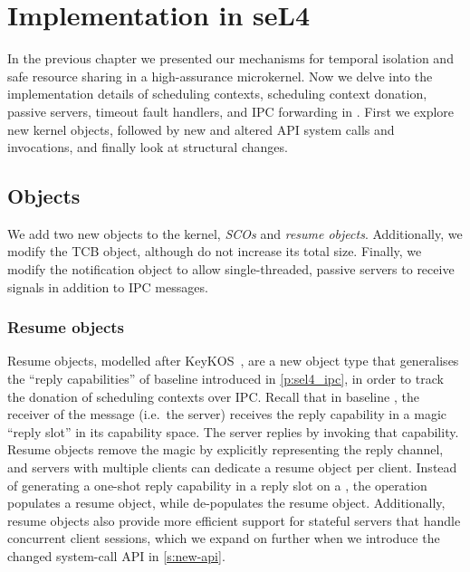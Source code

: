\chapter{Implementation in seL4}
\label{chap:implementation}

In the previous chapter we presented our mechanisms for temporal isolation and safe resource sharing
in a high-assurance microkernel. 
Now we delve into the implementation details of scheduling contexts, scheduling context donation,
passive servers, timeout fault handlers, and IPC forwarding in \selfour. First we explore new kernel
objects, followed by new and altered API system calls and invocations, and finally look at structural changes.

\section{Objects}

We add two new objects to the kernel, \emph{\glspl{SCO}} and \emph{resume objects}. Additionally, we modify
the \gls{TCB} object, although do not increase its total size. Finally, we modify the notification
object to allow single-threaded, passive servers to receive signals in
addition to IPC messages.

\subsection{Resume objects}
\label{s:resume}

Resume objects, modelled after KeyKOS~\citep{Bomberger_FFHLS_92}, are a new object type that
generalises the ``reply capabilities'' of baseline \selfour introduced in \cref{p:sel4_ipc}, in
order to track the donation of scheduling contexts over \gls{IPC}.  Recall that in
baseline \selfour, the receiver of the message (i.e.\ the server) receives the reply capability in a
magic ``reply slot'' in its capability space. The server replies by invoking that capability. Resume
objects remove the magic by explicitly representing the reply channel, and servers with multiple
clients can dedicate a resume object per client.  Instead of generating a one-shot reply capability
in a reply slot on a \call, the operation populates a resume object, while \recv de-populates the
resume object.  Additionally, resume objects also provide more efficient support for stateful servers that handle concurrent
client sessions, which we expand on further when we introduce the changed system-call \gls{API} in
\cref{s:new-api}.

